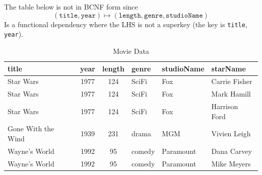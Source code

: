 \documentclass{article}
\begin{document}
    \begin{example}
      The table below is not in BCNF form since 
      \begin{equation}
        (\texttt{title}, \texttt{year}) \mapsto (\texttt{length}, \texttt{genre}, \texttt{studioName}) 
      \end{equation}
      Is a functional dependency where the LHS is not a superkey (the key is \texttt{title}, \texttt{year}). 
      \begin{table}[H]
        \centering
        \begin{tabular}{|l|c|c|l|l|l|}
        \hline
        \textbf{title} & \textbf{year} & \textbf{length} & \textbf{genre} & \textbf{studioName} & \textbf{starName} \\
        \hline
        Star Wars & 1977 & 124 & SciFi & Fox & Carrie Fisher \\
        Star Wars & 1977 & 124 & SciFi & Fox & Mark Hamill \\
        Star Wars & 1977 & 124 & SciFi & Fox & Harrison Ford \\
        Gone With the Wind & 1939 & 231 & drama & MGM & Vivien Leigh \\
        Wayne's World & 1992 & 95 & comedy & Paramount & Dana Carvey \\
        Wayne's World & 1992 & 95 & comedy & Paramount & Mike Meyers \\
        \hline
        \end{tabular}
        \caption{Movie Data}
        \label{tab:moviedata}
      \end{table} 
    \end{example}
\end{document}
